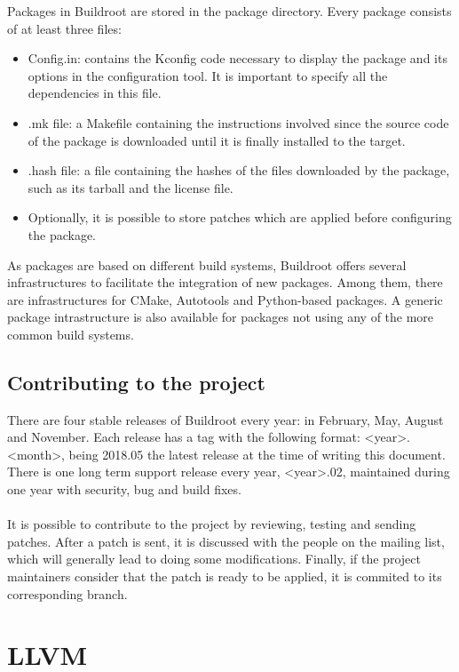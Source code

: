 \documentclass[12pt,a4paper,oneside]{article}
\begin{document}
Packages in Buildroot are stored in the {\selectfont package}
directory. Every package consists of at least three files:
\begin{itemize}
  \item Config.in: contains the Kconfig code necessary to display the package
  and its options in the configuration tool. It is important to specify all
  the dependencies in this file.
  \item .mk file: a Makefile containing the instructions involved since the
  source code of the package is downloaded until it is finally installed to the
  target.
  \item .hash file: a file containing the hashes of the files downloaded by the
  package, such as its tarball and the license file.
  \item Optionally, it is possible to store patches which are applied before
  configuring the package.
\end{itemize}
As packages are based on different build systems, Buildroot offers several
infrastructures to facilitate the integration of new packages. Among them, there
are infrastructures for CMake, Autotools and Python-based packages. A generic
package intrastructure is also available for packages not using any of the more
common build systems.

\subsection{Contributing to the project}

There are four stable releases of Buildroot every year: in February, May, August
and November. Each release has a tag with the following format:
\textless year\textgreater.\textless month\textgreater, being 2018.05 the latest
release at the time of writing this document. There is one long term support
release every year, \textless year\textgreater.02, maintained during one year
with security, bug and build fixes.\\\\
It is possible to contribute to the project by reviewing, testing and sending
patches. After a patch is sent, it is discussed with the people on the mailing
list, which will generally lead to doing some modifications. Finally, if the
project maintainers consider that the patch is ready to be applied, it is
commited to its corresponding branch.

\newpage
\section{LLVM} \label{LLVM}
\end{document}
